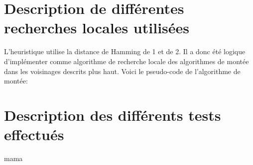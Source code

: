 \documentclass[fleqn]{article}
\begin{document}
\section{Description de différentes recherches locales utilisées}
L'heuristique utilise la distance de Hamming de 1 et de 2. Il a donc été logique d'implémenter comme algorithme de recherche locale des algorithmes de montée dans les voisinages descrits plus haut. 
Voici le pseudo-code de l'algorithme de montée:\\
\section{Description des différents tests effectués}
mama
\end{document}
